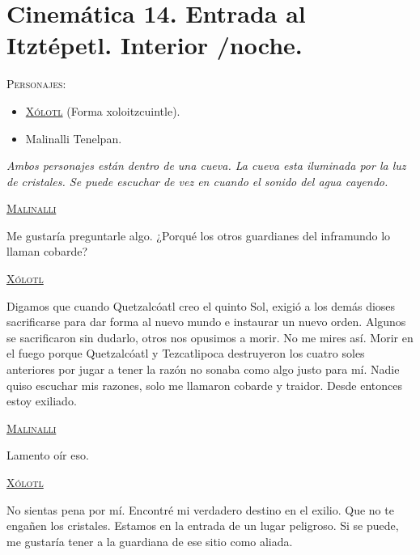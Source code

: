 \section{Cinemática 14. Entrada al Itztépetl. Interior /noche.} \label{Cin:Cinematica14}
 \textsc{Personajes}:
 \begin{itemize}
 \item \textsc{\underline{Xólotl}} (Forma xoloitzcuintle).
 \item Malinalli Tenelpan.

 \end{itemize}
 \textit{Ambos personajes están dentro de una cueva.  La cueva esta iluminada por la luz de cristales. Se puede escuchar de vez en cuando el sonido del agua cayendo. }

\begin{center}
\textsc{\underline{Malinalli}}
\\
\par
Me gustaría preguntarle algo. ¿Porqué los otros guardianes del inframundo lo llaman cobarde?
\\
\par
\textsc{\underline{Xólotl}}
\\
\par
Digamos que cuando Quetzalcóatl creo el quinto Sol, exigió a los demás dioses sacrificarse para dar forma al nuevo mundo e instaurar un nuevo orden. Algunos se sacrificaron sin dudarlo, otros nos opusimos a morir. No me mires así. Morir en el fuego porque Quetzalcóatl y Tezcatlipoca destruyeron los cuatro soles anteriores por jugar a tener la razón no sonaba como algo justo para mí. Nadie quiso escuchar mis razones, solo me llamaron cobarde y traidor. Desde entonces estoy exiliado.
\\
\par
\textsc{\underline{Malinalli}}
\\
\par
Lamento oír eso.
\\
\par
\textsc{\underline{Xólotl}}
\\
\par
No sientas pena por mí. Encontré mi verdadero destino en el exilio. Que no te engañen los cristales. Estamos en la entrada de un lugar peligroso. Si se puede, me gustaría tener a la guardiana de ese sitio como aliada. 
\end{center}
